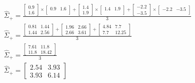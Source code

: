 \documentclass[leqno]{article}
\begin{document}
\begin{gather*}
\begin{split}
&\hat{\Sigma}_+ = 
\frac{\begin{bmatrix}
   0.9\\
   1.6 
\end{bmatrix} \times \begin{bmatrix}
   0.9 & 1.6\\
\end{bmatrix} + 
\begin{bmatrix}
   1.4\\
   1.9 
\end{bmatrix} \times \begin{bmatrix}
   1.4 & 1.9\\
\end{bmatrix} +
\begin{bmatrix}
   -2.2\\
   -3.5 
\end{bmatrix} \times \begin{bmatrix}
   -2.2 & -3.5\\
\end{bmatrix}}{3}\\ 
&\hat{\Sigma}_+ = 
\frac{\begin{bmatrix}
   0.81 & 1.44\\
   1.44 & 2.56 
\end{bmatrix} + 
\begin{bmatrix}
   1.96 & 2.66\\
   2.66 & 3.61 
\end{bmatrix} +
\begin{bmatrix}
   4.84 & 7.7\\
   7.7 & 12.25 
\end{bmatrix}
 }{3}\\
&\hat{\Sigma}_+ = 
\frac{\begin{bmatrix}
   7.61 & 11.8\\
   11.8 & 18.42 
\end{bmatrix}}{3}\\
&\hat{\Sigma}_+ = 
\begin{bmatrix}
   2.54 & 3.93\\
   3.93 & 6.14 
\end{bmatrix}\\
\end{split}
\end{gather*}
\end{document}
